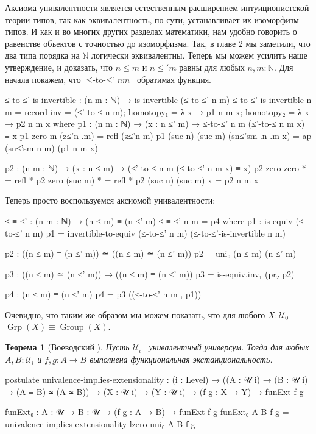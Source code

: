 \documentclass{article}[12pt]
\newtheorem{theorem}{Теорема}
\newcommand{\dash}{\textemdash\ }
\newcommand{\op}{\operatorname}
\begin{document}
Аксиома унивалентности является естественным расширением интуиционистской теории типов, так как
эквивалентность, по сути, устанавливает их изоморфизм типов. И как и во многих других
разделах математики, нам удобно говорить о равенстве объектов с точностью до изоморфизма.
Так, в главе 2 мы заметили, что два типа порядка на $\mathbb{N}$ логически эквивалентны.
Теперь мы можем усилить наше утверждение, и доказать, что $n \leq m$ и $n \leq' m$ равны
для любых $n, m : \mathbb{N}$. Для начала покажем, что $\op{≤-to-≤’} n m$ \dash обратимая
функция.
\begin{code}
≤-to-≤'-is-invertible : (n m : ℕ) → is-invertible (≤-to-≤' n m)
≤-to-≤'-is-invertible n m = 
    record {inv = (≤'-to-≤ n m);
            homotopy₁ = λ x → p1 n m x;
            homotopy₂ = λ x → p2 n m x}
    where
        p1 : (n m : ℕ) → (x : n ≤' m) → ≤-to-≤' n m (≤'-to-≤ n m x) ≡ x
        p1 zero m (z≤'n .m) = refl (z≤'n m)
        p1 (suc n) (suc m) (sn≤'sm .n .m x) = ap (sn≤'sm n m) (p1 n m x)

        p2 : (n m : ℕ) → (x : n ≤ m) → (≤'-to-≤ n m (≤-to-≤' n m x) ≡ x)
        p2 zero zero * = refl *
        p2 zero (suc m) * = refl *
        p2 (suc n) (suc m) x = p2 n m x
\end{code}
Теперь просто воспользуемся аксиомой унивалентности:
\begin{code}
≤-≡-≤' : (n m : ℕ) → (n ≤ m) ≡ (n ≤' m)
≤-≡-≤' n m = p4
    where
        p1 : is-equiv (≤-to-≤' n m)
        p1 = invertible-to-equiv (≤-to-≤' n m) (≤-to-≤'-is-invertible n m)

        p2 : ((n ≤ m) ≡ (n ≤' m)) ≃ ((n ≤ m) ≃ (n ≤' m))
        p2 = uni₀ (n ≤ m) (n ≤' m)

        p3 :  ((n ≤ m) ≃ (n ≤' m)) → ((n ≤ m) ≡ (n ≤' m))
        p3 = is-equiv.inv₁ (pr₂ p2)

        p4 : (n ≤ m) ≡ (n ≤' m)
        p4 = p3 ((≤-to-≤' n m , p1))
\end{code}

Очевидно, что таким же образом мы можем показать, что для любого $X : \mathcal{U}_0$ 
$\op{Grp}(X) \equiv \op{Group}(X)$.

\begin{theorem}[Воеводский \cite{Rij22}]
    Пусть $\mathcal U_i$ \dash унивалентный универсум. Тогда для любых $A, B : \mathcal U_i$ и
    $f, g : A \rightarrow B$ выполнена функциональная экстанциональность.
\end{theorem}
\begin{code}
postulate
    univalence-implies-extensionality : (i : Level) 
        → ((A : 𝒰 i) → (B : 𝒰 i) → (A ≡ B) ≃ (A ≃ B))
        → (X : 𝒰 i) → (Y : 𝒰 i)
        → (f g : X → Y)
        → funExt f g

funExt₀ : {A : 𝒰} → {B : 𝒰}
          → (f g : A → B)
          → funExt f g
funExt₀ {A} {B} f g = univalence-implies-extensionality lzero uni₀ A B f g
\end{code}
\end{document}
